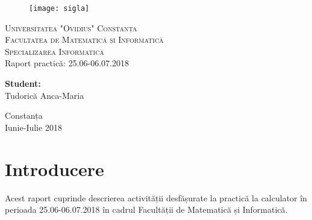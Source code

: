 \documentclass{report}
\begin{document}
\begin{titlepage}
 \begin{figure}
\texttt{[image: sigla]}\\
\end{figure}
\begin{center}
    \textsc{\normalsize Universitatea "Ovidius" Constanța\\
  Facultatea de Matematică și Informatică\\
  Specializarea Informatică}\\
  [4cm]
    {\Large \sc Raport practică: 25.06-06.07.2018}\\[7cm]
    \begin{flushright} \large
    \textbf{Student:\ \ \ \ \ } \\
    Tudorică Anca-Maria
   \end{flushright}
  \vfill
  {\large Constanța}\\
  {\large Iunie-Iulie 2018}
 \end{center}
\end{titlepage}

\tableofcontents
\chapter{Introducere}

Acest raport cuprinde descrierea activității desfășurate la practică la calculator în perioada 25.06-06.07.2018 în cadrul Facultății de Matematică și Informatică.
\end{document}
